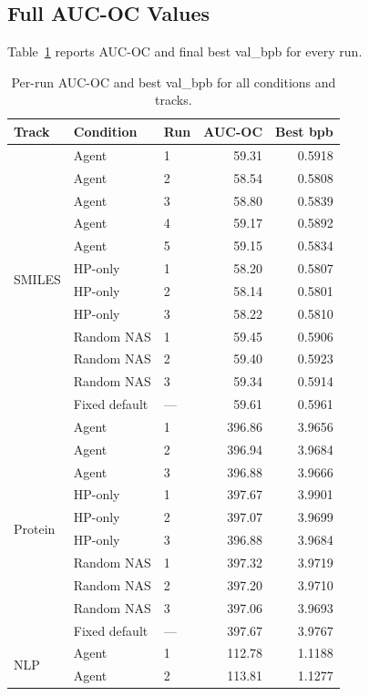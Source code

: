 \subsection{Full AUC-OC Values}

Table~\ref{tab:auc_full} reports AUC-OC and final best val\_bpb for every run.

\begin{table}[h]
\centering
\caption{Per-run AUC-OC and best val\_bpb for all conditions and tracks.}
\label{tab:auc_full}
\small
\begin{tabular}{@{}lllrr@{}}
\toprule
\textbf{Track} & \textbf{Condition} & \textbf{Run} & \textbf{AUC-OC} & \textbf{Best bpb} \\
\midrule
\multirow{12}{*}{SMILES}
& Agent & 1 & 59.31 & 0.5918 \\
& Agent & 2 & 58.54 & 0.5808 \\
& Agent & 3 & 58.80 & 0.5839 \\
& Agent & 4 & 59.17 & 0.5892 \\
& Agent & 5 & 59.15 & 0.5834 \\
& HP-only & 1 & 58.20 & 0.5807 \\
& HP-only & 2 & 58.14 & 0.5801 \\
& HP-only & 3 & 58.22 & 0.5810 \\
& Random NAS & 1 & 59.45 & 0.5906 \\
& Random NAS & 2 & 59.40 & 0.5923 \\
& Random NAS & 3 & 59.34 & 0.5914 \\
& Fixed default & --- & 59.61 & 0.5961 \\
\midrule
\multirow{10}{*}{Protein}
& Agent & 1 & 396.86 & 3.9656 \\
& Agent & 2 & 396.94 & 3.9684 \\
& Agent & 3 & 396.88 & 3.9666 \\
& HP-only & 1 & 397.67 & 3.9901 \\
& HP-only & 2 & 397.07 & 3.9699 \\
& HP-only & 3 & 396.88 & 3.9684 \\
& Random NAS & 1 & 397.32 & 3.9719 \\
& Random NAS & 2 & 397.20 & 3.9710 \\
& Random NAS & 3 & 397.06 & 3.9693 \\
& Fixed default & --- & 397.67 & 3.9767 \\
\midrule
\multirow{12}{*}{NLP}
& Agent & 1 & 112.78 & 1.1188 \\
& Agent & 2 & 113.81 & 1.1277 \\

\end{tabular}
\end{table}
